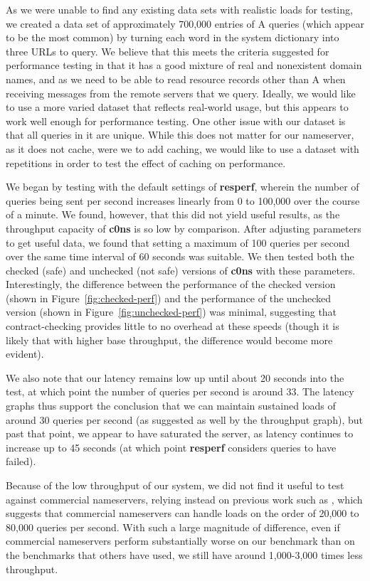 \documentclass{article}
\newcommand\Kwd[1]{{\sffamily\bfseries{#1}}}
\begin{document}
As we were unable to find any existing data sets with realistic loads for testing, we created a data set of approximately 700,000 entries of A queries (which appear to be the most common) by turning each word in the system dictionary into three URLs to query. We believe that this meets the criteria suggested for performance testing in that it has a good mixture of real and nonexistent domain names, and as we need to be able to read resource records other than A when receiving messages from the remote servers that we query. Ideally, we would like to use a more varied dataset that reflects real-world usage, but this appears to work well enough for performance testing. One other issue with our dataset is that all queries in it are unique. While this does not matter for our nameserver, as it does not cache, were we to add caching, we would like to use a dataset with repetitions in order to test the effect of caching on performance.

We began by testing with the default settings of \Kwd{resperf}, wherein the number of queries being sent per second increases linearly from 0 to 100,000 over the course of a minute. We found, however, that this did not yield useful results, as the throughput capacity of \Kwd{c0ns} is so low by comparison. After adjusting parameters to get useful data, we found that setting a maximum of 100 queries per second over the same time interval of 60 seconds was suitable. We then tested both the checked (safe) and unchecked (not safe) versions of \Kwd{c0ns} with these parameters. Interestingly, the difference between the performance of the checked version (shown in Figure~\ref{fig:checked-perf}) and the performance of the unchecked version (shown in Figure~\ref{fig:unchecked-perf}) was minimal, suggesting that contract-checking provides little to no overhead at these speeds (though it is likely that with higher base throughput, the difference would become more evident).

We also note that our latency remains low up until about 20 seconds into the test, at which point the number of queries per second is around 33. The latency graphs thus support the conclusion that we can maintain sustained loads of around 30 queries per second (as suggested as well by the throughput graph), but past that point, we appear to have saturated the server, as latency continues to increase up to 45 seconds (at which point \Kwd{resperf} considers queries to have failed).

Because of the low throughput of our system, we did not find it useful to test against commercial nameservers, relying instead on previous work such as \cite{fagin2017making}, which suggests that commercial nameservers can handle loads on the order of 20,000 to 80,000 queries per second. With such a large magnitude of difference, even if commercial nameservers perform substantially worse on our benchmark than on the benchmarks that others have used, we still have around 1,000-3,000 times less throughput.
\end{document}

